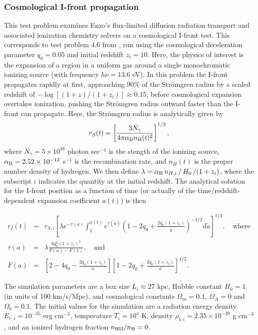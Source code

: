 \subsubsection{Cosmological I-front propagation}
\label{sec.tests.fld}

This test problem examines Enzo's flux-limited diffusion radiation
transport and associated ionization chemistry solvers on a
cosmological I-front test.  This corresponds to test problem 4.6 from
\cite{ReynoldsHayesPaschosNorman2009}, run using the cosmological
deceleration parameter $q_0 = 0.05$ and initial redshift $z_i=10$.
Here, the physics of interest is the expansion of a  region
in a uniform gas around a single monochromatic ionizing source (with
frequency $h\nu = 13.6$ eV).  In this problem the I-front propagates
rapidly at first, approaching 90\% of the Str{\" o}mgren radius by a
scaled redshift of $-\log\left[(1+z)/(1+z_i)\right] \approx 0.15$,
before cosmological expansion overtakes ionization, pushing the Str{\"
o}mgren radius outward faster than the I-front can propagate.  Here,
the Str{\" o}mgren radius is analytically given by
\[
   r_S(t) = \left[\frac{3\dot{N}_{\gamma}}{4\pi \alpha_{\rm B}
   n_{\rm H}(t)^2}\right]^{1/3}, 
\]
where $\dot{N}_{\gamma} = 5 \times 10^{48}$ photon sec$^{-1}$ is the
stength of the ionizing source, $\alpha_{\rm B} = 2.52 \times 10^{-13}$
s$^{-1}$ is the  recombination rate, and $n_H(t)$ is the
proper number density of hydrogen.  We then define $\lambda =
\alpha_{\rm B}\, n_{H,i}\, /\, H_0\, / (1+z_i)$, where the subscript $i$
indicates the quantity at the initial redshift.  The analytical
solution for the I-front position as a function of time (or actually
of the time/redshift-dependent expansion coefficient $a(t)$) is then

\begin{eqnarray*}
   r_I(t) &=& r_{S,i} \left[\lambda e^{-\tau(a)} \int_1^{a(t)}
     e^{\tau(\tilde a)} \left(1 - 2q_0
     + \frac{2q_0(1+z_i)}{\tilde{a}}\right)^{-1/2}\mathrm
     d\tilde{a}\right]^{1/3}, \quad\text{where} \\ 
   \tau(a) &=& \lambda\frac{6q_0^2(1+z_i)^2}{F(a)-F(1)}, 
     \quad\text{and} \\
   F(a) &=& \left[2-4q_0 - \frac{2q_o(1+z_i)}{a}\right] 
      \left[1-2q_0 + \frac{2q_0(1+z_i)}{a}\right]^{1/2}.
\end{eqnarray*}

The simulation parameters are a box size $L_i\approx 27$ kpc, Hubble
constant $H_0 = 1$ (in units of 100 km/s/Mpc), and cosmological
constants $\Omega_m = 0.1$, $\Omega_A=0$ and $\Omega_b = 0.1$.  The
initial values for the simulation are a radiation energy density
$E_{r,i} = 10^{-35}$ erg cm$^{-3}$, temperature $T_i = 10^4$ K,
density $\rho_{b,i} = 2.35 \times 10^{-28}$ g cm$^{-3}$, and an
ionized hydrogen fraction $n_{\rm HII}/n_{\rm H} = 0$.

